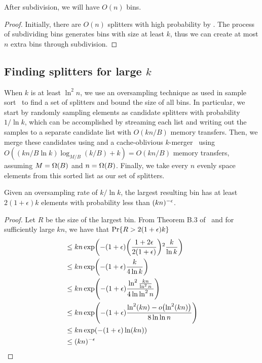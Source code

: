 \begin{lemma}
After subdivision, we will have $O(n)$ bins.
\end{lemma}
\begin{proof}
Initially, there are $O(n)$ splitters with high probability by .
The process of subdividing bins generates bins with size at least $k$, thus we
can create at most $n$ extra bins through subdivision.
\end{proof}

\subsection*{Finding splitters for large $k$}

When $k$ is at least $\ln ^2 n$, we use an oversampling technique as used in 
sample sort~\cite{BlellochLeMa91} to find a set of splitters and bound the 
size of all bins.  In particular, we start by randomly sampling elements as 
candidate splitters with probability $1/\ln k$, which can be accomplished by streaming
each list and writing out the samples to a separate candidate list with $O(kn/B)$ memory transfers.  
Then, we merge these candidates using and a cache-oblivious $k$-merger~\cite{FrigoLePr99} using 
$O((kn/B\ln k) \log_{M/B} (k/B) + k) = O(kn/B)$ memory transfers, assuming $M=\Omega \mathopen{}\left(B\right)\mathclose{}$
and $n=\Omega \mathopen{}\left(B\right)\mathclose{}$.  Finally, we take
every $n$ evenly space elements from this sorted list as our set of splitters.

\begin{theorem}
  Given an oversampling rate of $k/\ln k$, the largest resulting bin has at least 
  $2(1+\epsilon)k$ elements with probability less than $\mathopen{}\left(kn\right)\mathclose{}^{-\epsilon}$.
\end{theorem}
\begin{proof}
  Let $R$ be the size of the largest bin.  
  From Theorem B.3 of~\cite{BlellochLeMa91} and for sufficiently large $kn$, 
  we have that $\Pr\mathopen{}\left\{ R > 2(1+\epsilon)k \right\}\mathclose{}$
  \begin{align*}
    &\leq kn \exp \mathopen{}\left( -(1+\epsilon)\mathopen{}\left(\frac{1+2\epsilon}{2(1+\epsilon)}\right)\mathclose{}^2 \frac{k}{\ln k} \right)\mathclose{}\\
    &\leq kn \exp \mathopen{}\left(-(1+\epsilon)\frac{k}{4\ln k}\right)\mathclose{}\\
    &\leq {kn} \exp \mathopen{}\left(-(1+\epsilon)\frac{\ln^2 \frac{kn}{\ln^2 n}}{4 \ln \ln ^2 n}\right)\mathclose{}\\
    &\leq {kn} \exp \mathopen{}\left(-(1+\epsilon)\frac{\ln^2 \mathopen{}\left(kn\right)\mathclose{} - o\mathopen{}\left(\ln^2 \mathopen{}\left(kn\right)\mathclose{}\right)\mathclose{} }{8 \ln \ln n}\right)\mathclose{}\\
    &\leq {kn} \exp \mathopen{}\left(-(1+\epsilon)\ln \mathopen{}\left(kn\right)\mathclose{}\right)\mathclose{}\\
    &\leq \mathopen{}\left(kn\right)\mathclose{}^{-\epsilon}\\
  \end{align*}
\end{proof}



